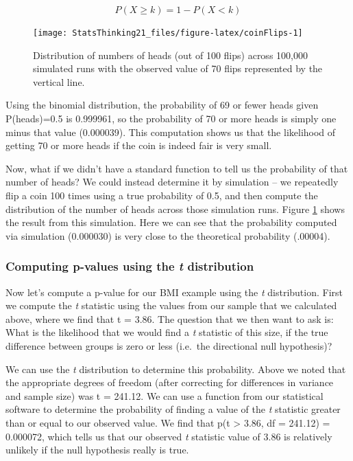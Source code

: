 \documentclass[12pt,]{book}
\theoremstyle{definition}
\theoremstyle{definition}
\theoremstyle{definition}
\theoremstyle{remark}
\begin{document}
\[
P(X \ge k) = 1 - P(X < k)
\]

\begin{figure}
\texttt{[image: StatsThinking21\_files/figure-latex/coinFlips-1]} \caption{Distribution of numbers of heads (out of 100 flips) across 100,000 simulated runs with the observed value of 70 flips represented by the vertical line.}\label{fig:coinFlips}
\end{figure}

Using the binomial distribution, the probability of 69 or fewer heads given P(heads)=0.5 is 0.999961, so the probability of 70 or more heads is simply one minus that value (0.000039).
This computation shows us that the likelihood of getting 70 or more heads if the coin is indeed fair is very small.

Now, what if we didn't have a standard function to tell us the probability of that number of heads? We could instead determine it by simulation -- we repeatedly flip a coin 100 times using a true probability of 0.5, and then compute the distribution of the number of heads across those simulation runs. Figure \ref{fig:coinFlips} shows the result from this simulation. Here we can see that the probability computed via simulation (0.000030) is very close to the theoretical probability (.00004).

\hypertarget{pvalues-tdist}{%
\subsubsection{\texorpdfstring{Computing p-values using the \emph{t} distribution}{Computing p-values using the t distribution}}\label{pvalues-tdist}}

Now let's compute a p-value for our BMI example using the \emph{t} distribution. First we compute the \emph{t} statistic using the values from our sample that we calculated above, where we find that t = 3.86. The question that we then want to ask is: What is the likelihood that we would find a \emph{t} statistic of this size, if the true difference between groups is zero or less (i.e.~the directional null hypothesis)?

We can use the \emph{t} distribution to determine this probability. Above we noted that the appropriate degrees of freedom (after correcting for differences in variance and sample size) was t = 241.12. We can use a function from our statistical software to determine the probability of finding a value of the \emph{t} statistic greater than or equal to our observed value. We find that p(t \textgreater{} 3.86, df = 241.12) = 0.000072, which tells us that our observed \emph{t} statistic value of 3.86 is relatively unlikely if the null hypothesis really is true.
\end{document}
